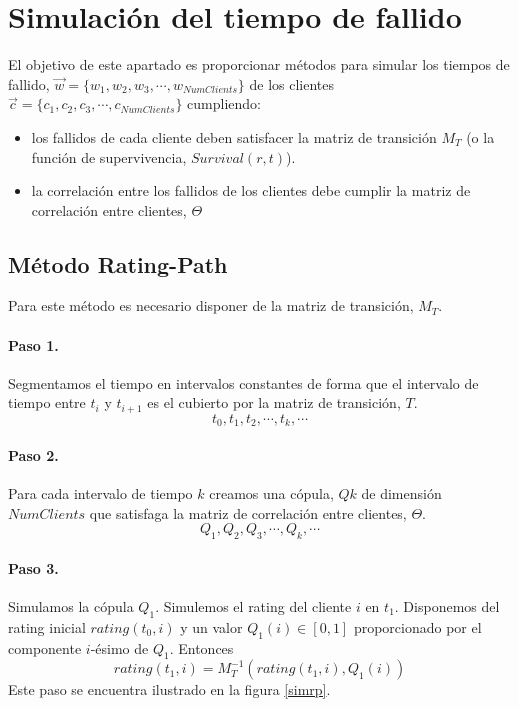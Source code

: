 
\section{Simulaci\'on del tiempo de fallido}

El objetivo de este apartado es proporcionar m\'etodos para simular los
tiempos de fallido, $\vec{w} = \{w_1,w_2,w_3,\cdots,w_{NumClients}\}$ de los
clientes $\vec{c} = \{c_1,c_2,c_3,\cdots,c_{NumClients}\}$ cumpliendo:
\begin{itemize}
\item los fallidos de cada cliente deben satisfacer la matriz de transici\'on $M_T$
(o la funci\'on de supervivencia, $Survival(r,t)$).
\item la correlaci\'on entre los fallidos de los clientes debe cumplir la matriz
de correlaci\'on entre clientes, $\Theta$
\end{itemize}

\subsection{M\'etodo Rating-Path}
\label{res:mrt}

Para este m\'etodo es necesario disponer de la matriz de transici\'on, $M_T$.

\paragraph{Paso 1.} Segmentamos el tiempo en intervalos constantes de forma que
el intervalo de tiempo entre $t_i$ y $t_{i+1}$ es el cubierto por la matriz de
transici\'on, $T$.
\begin{displaymath}
t_0,t_1,t_2,\cdots,t_k, \cdots
\end{displaymath}

\paragraph{Paso 2.} Para cada intervalo de tiempo $k$ creamos una c\'opula,
$Qk$ de dimensi\'on $NumClients$ que satisfaga la matriz de correlaci\'on entre
clientes, $\Theta$.
\begin{displaymath}
Q_1, Q_2, Q_3, \cdots, Q_k, \cdots
\end{displaymath}

\paragraph{Paso 3.} Simulamos la c\'opula $Q_1$. Simulemos el rating del cliente
$i$ en $t_1$. Disponemos del rating inicial $rating(t_0,i)$ y un valor $Q_1(i) \in [0,1]$
proporcionado por el componente $i$-\'esimo de $Q_1$. Entonces
\begin{displaymath}
rating(t_1,i) = M_T^{-1}(rating(t_1,i),Q_1(i))
\end{displaymath}
Este paso se encuentra ilustrado en la figura \ref{simrp}.

